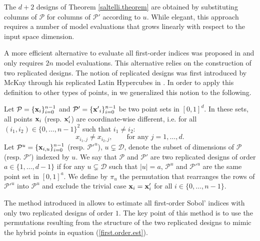 The $d+2$ designs of Theorem \ref{saltelli.theorem} are obtained by substituting columns of $\mathcal{P}$ for columns of $\mathcal{P}'$ {\color{purple}according} to $u$. While elegant, this approach requires a number of model evaluations that grows linearly with respect to the input \break space dimension.

A more efficient alternative to evaluate all first-order indices was proposed in \cite{Mara} and only requires $2n$ model evaluations. This alternative relies on the construction of two replicated designs. The notion of replicated designs was first introduced by McKay through his replicated Latin Hypercubes in \cite{McKay}. In order to apply this definition to other types of points, in \cite{GJAHMP} we generalized this notion to the following.

{\color{purple}  
\begin{definition}
\label{rep.designs}
Let $\mathcal{P}=\{\boldsymbol{\mathbf{x}}_i\}_{i=0}^{n-1}$ and $\mathcal{P}'=\{{\boldsymbol{\mathbf{x}}'}_i\}_{i=0}^{n-1}$ be two point sets in $[0,1]^{d}$. In these sets, all points $\boldsymbol{\mathbf{x}}_i$ (resp. $\boldsymbol{\mathbf{x}}'_i$) are coordinate-wise different, i.e. for all $(i_1,i_2) \in \{0,\dots,n-1\}^2$ such that $i_1 \neq i_2$: $$x_{i_1,j} \neq x_{i_2,j}, \qquad \text{for any  } j=1,\dots,d .$$
Let $\mathcal{P}^u=\{\boldsymbol{\mathbf{x}}_{i,u}\}_{i=0}^{n-1}$ (resp. ${\mathcal{P}'}^u$), $u \subsetneq \mathcal{D}$, denote the subset of dimensions of $\mathcal{P}$ (resp. $\mathcal{P}'$) indexed by $u$. We say that $\mathcal{P}$ and $\mathcal{P}'$ are two replicated designs of order $a \in \{1,\dots,d-1\}$ if for any $u \subsetneq \mathcal{D}$ such that $|u|=a$, $\mathcal{P}^u$ and ${\mathcal{P}'}^u$ are the same point set in $[0,1]^a$. We define by $\pi_u$ the permutation that rearranges the rows of ${\mathcal{P}'}^u$ into $\mathcal{P}^u$ and exclude the trivial case $\boldsymbol{\mathbf{x}}_i = \boldsymbol{\mathbf{x}}'_i$ for all $i\in\{0,\dots,n-1\}$.
\end{definition}
}

The method introduced in \cite{Mara} allows to estimate all first-order Sobol' indices with only two replicated designs of order $1$. The key point of this method is to use the permutations resulting from the structure of the two replicated designs to mimic the hybrid points in equation (\ref{first.order.est}). 

